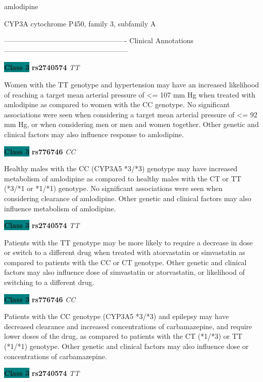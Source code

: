 \documentclass{resume} %
\begin{document}
\begin{rSection}{ amlodipine }
\begin{rSubsection}{ CYP3A }{ cytochrome P450, family 3, subfamily A }{}{}
\item[]

\item[] ---------------------------------------------------- Clinical Annotations -----------------------------------------------------\newline
\item \textbf{\colorbox{teal} {Class 3}} \textbf{ rs2740574 } \textit{ TT }
\item[] Women with the TT genotype and hypertension may have an increased likelihood of reaching a target mean arterial pressure of <= 107 mm Hg when treated with amlodipine as compared to women with the CC genotype. No significant associations were seen when considering a target mean arterial pressure of <= 92 mm Hg, or when considering men or men and women together. Other genetic and clinical factors may also influence response to amlodipine.\item \textbf{\colorbox{teal} {Class 3}} \textbf{ rs776746 } \textit{ CC }
\item[] Healthy males with the CC (CYP3A5 *3/*3) genotype may have increased metabolism of amlodipine as compared to healthy males with the CT or TT (*3/*1 or *1/*1) genotype. No significant associations were seen when considering clearance of amlodipine. Other genetic and clinical factors may also influence metabolism of amlodipine.\item \textbf{\colorbox{teal} {Class 3}} \textbf{ rs2740574 } \textit{ TT }
\item[] Patients with the TT genotype may be more likely to require a decrease in dose or switch to a different drug when treated with atorvastatin or simvastatin as compared to patients with the CC or CT genotype. Other genetic and clinical factors may also influence dose of simvastatin or atorvastatin, or likelihood of switching to a different drug.\item \textbf{\colorbox{teal} {Class 3}} \textbf{ rs776746 } \textit{ CC }
\item[] Patients with the CC genotype (CYP3A5 *3/*3) and epilepsy may have decreased clearance and increased concentrations of carbamazepine, and require lower doses of the drug, as compared to patients with the CT (*1/*3) or TT (*1/*1) genotype. Other genetic and clinical factors may also influence dose or concentrations of carbamazepine.\item \textbf{\colorbox{teal} {Class 3}} \textbf{ rs2740574 } \textit{ TT }

\end{rSubsection}
\end{rSection}
\end{document}
